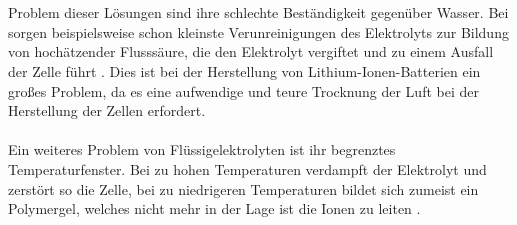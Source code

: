 \documentclass[a4paper, 11pt, headsepline,footsepline,twoside,abstract]{scrbook}
\begin{document}
\\\\
Problem dieser Lösungen sind ihre schlechte Beständigkeit gegenüber Wasser. Bei  sorgen beispielsweise schon kleinste Verunreinigungen des Elektrolyts zur Bildung von hochätzender Flusssäure, die den Elektrolyt vergiftet und zu einem Ausfall der Zelle führt \cite{xu2004nonaqueous}. Dies ist bei der Herstellung von Lithium-Ionen-Batterien ein großes Problem, da es eine aufwendige und teure Trocknung der Luft bei der Herstellung der Zellen erfordert.
\\\\
Ein weiteres Problem von Flüssigelektrolyten ist ihr begrenztes Temperaturfenster. Bei zu hohen Temperaturen verdampft der Elektrolyt und zerstört so die Zelle, bei zu niedrigeren Temperaturen bildet sich zumeist ein Polymergel, welches nicht mehr in der Lage ist die Ionen zu leiten \cite{blomgren2003liquid}.
\end{document}
